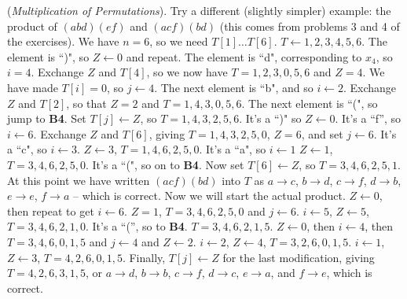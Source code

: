 \vskip 0.15in
 ({\it Multiplication of Permutations}). \hfil\break
Try a different (slightly simpler) example:
the product of $\left(a b d\right) \left(e f\right)$ and 
$\left(a c f\right)\left(b d\right)$ (this comes from problems 3 and 4
of the exercises).  We have $n = 6$, so we need $T\left[1\right] \ldots T\left[6\right]$.
\vskip 0.05in
 $T \gets {1, 2, 3, 4, 5, 6}$. \hfil\break
{} The element is ``)", so $Z \gets 0$ and repeat.\hfil\break
{} The element is ``d", corresponding to $x_4$, so $i = 4$.\hfil\break
{} Exchange $Z$ and $T\left[4\right]$, so we now have
 $T = {1, 2, 3, 0, 5, 6}$ and $Z = 4$.  We have made $T\left[i\right] = 0$,
  so $j \gets 4$.\hfil\break
{} The next element is ``b", and so $i \gets 2$.\hfil\break
{} Exchange $Z$ and $T\left[2\right]$, so that
 $Z = 2$ and $T = {1, 4, 3, 0, 5, 6}$.\hfil\break
{} The next element is ``(", so jump to {\bf B4}.\hfil\break
{} Set $T\left[j\right] \gets Z$, so $T = {1, 4, 3, 2, 5, 6}$.\hfil\break
{} It's a ``)" so $Z \gets 0$.\hfil\break
{} It's a ``f'', so $i \gets 6$.\hfil\break
{} Exchange $Z$ and $T\left[6\right]$, giving
 $T = {1, 4, 3, 2, 5, 0}$, $Z = 6$, and set $j \gets 6$.\hfil\break
{} It's a ``c", so $i \gets 3$.\hfil\break
{} $Z \gets 3$, $T = {1, 4, 6, 2, 5, 0}$.\hfil\break
{} It's a ``a", so $i \gets 1$\hfil\break
{} $Z \gets 1$, $T = {3, 4, 6, 2, 5, 0}$.\hfil\break
{} It's a ``(", so on to {\bf B4}.\hfil\break
{} Now set $T\left[6\right] \gets Z$, so
 $T = {3, 4, 6, 2, 5, 1}.$
At this point we have written $\left(a c f\right)\left( b d \right)$ into $T$
as $a \to c$, $b \to d$, $c \to f$, $d \to b$, $e \to e$, $f \to a$ -- which
is correct. Now we will start the actual product. \hfil\break
{} $Z \gets 0$, then repeat to get $i \gets 6$.\hfil\break
{} $Z = 1$, $T = 3, 4, 6, 2, 5, 0$ and $j \gets 6$.\hfil\break
{} $i \gets 5$, $Z \gets 5$, $T = 3, 4, 6, 2, 1, 0$.\hfil\break
{} It's a ``('', so to {\bf B4}.\hfil\break
{} $T = 3, 4, 6, 2, 1, 5$.\hfil\break
{} $Z \gets 0$, then $i \gets 4$, then $T = 3, 4, 6, 0, 1, 5$
and $j \gets 4$ and $Z \gets 2$.\hfil\break
{} $i \gets 2$, $Z \gets 4$, $T = 3, 2, 6, 0, 1, 5$.\hfil\break
{} $i \gets 1$, $Z \gets 3$, $T = 4, 2, 6, 0, 1, 5$.\hfil\break
{} Finally, $T\left[j\right] \gets Z$ for the last modification, giving
$T = 4, 2, 6, 3, 1, 5$, or $a \to d$, $b \to b$, $c \to f$, $d \to c$, $e \to a$, and
$f \to e$, which is correct.

